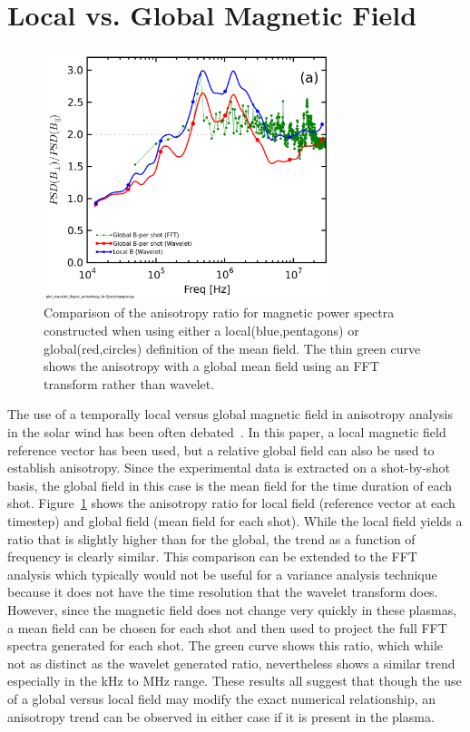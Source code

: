 \documentclass[aip,prl,amsmath,amssymb,reprint,superscriptaddress]{revtex4-1} %
\begin{document}
\section{Local vs. Global Magnetic Field}\label{sec:LocGlobe}

\begin{figure}[!htbp]
\centerline{
\includegraphics[width=8.5cm]{BperpparaGlobalBcomp_chan1t4_1mWbspectra}}
\caption{\label{fig:globalcomparison} Comparison of the anisotropy ratio for magnetic power spectra constructed when using either a local(blue,pentagons) or global(red,circles) definition of the mean field. The thin green curve shows the anisotropy with a global mean field using an FFT transform rather than wavelet.}
\end{figure}

The use of a temporally local versus global magnetic field in anisotropy analysis in the solar wind has been often debated~\cite{podesta09,matthaeus12}. In this paper, a local magnetic field reference vector has been used, but a relative global field can also be used to establish anisotropy. Since the experimental data is extracted on a shot-by-shot basis, the global field in this case is the mean field for the time duration of each shot. Figure~\ref{fig:globalcomparison} shows the anisotropy ratio for local field (reference vector at each timestep) and global field (mean field for each shot). While the local field yields a ratio that is slightly higher than for the global, the trend as a function of frequency is clearly similar. This comparison can be extended to the FFT analysis which typically would not be useful for a variance analysis technique because it does not have the time resolution that the wavelet transform does. However, since the magnetic field does not change very quickly in these plasmas, a mean field can be chosen for each shot and then used to project the full FFT spectra generated for each shot. The green curve shows this ratio, which while not as distinct as the wavelet generated ratio, nevertheless shows a similar trend especially in the kHz to MHz range. These results all suggest that though the use of a global versus local field may modify the exact numerical relationship, an anisotropy trend can be observed in either case if it is present in the plasma.
\end{document}
